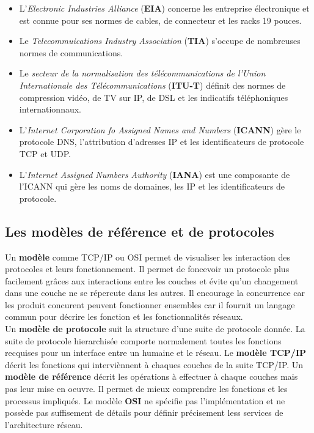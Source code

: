  \begin{itemize}
	 \item L'\textit{Electronic Industries Alliance} (\textbf{EIA}) concerne les entreprise électronique et est connue pour ses normes de cables, de connecteur et les racks 19 pouces.
	 \item Le \textit{Telecommuications Industry Association} (\textbf{TIA}) s'occupe de nombreuses normes de communications.
	 \item Le \textit{secteur de la normalisation des télécommunications de l'Union Internationale des Télécommunications} (\textbf{ITU-T}) définit des normes de compression vidéo, de TV sur IP, de DSL et les indicatifs téléphoniques internationnaux.
	 \item L'\textit{Internet Corporation fo Assigned Names and Numbers} (\textbf{ICANN}) gère le protocole DNS, l'attribution d'adresses IP et les identificateurs de protocole TCP et UDP\@.
	 \item L'\textit{Internet Assigned Numbers Authority} (\textbf{IANA}) est une composante de l'ICANN qui gère les noms de domaines, les IP et les identificateurs de protocole.
 \end{itemize}

 \subsection{Les modèles de référence et de protocoles}
 Un \textbf{modèle} comme TCP/IP ou OSI permet de visualiser les interaction des protocoles et leurs fonctionnement. Il permet de foncevoir un protocole plus facilement grâces aux interactions entre les couches et évite qu'un changement dans une couche ne se répercute dans les autres. Il encourage la concurrence car les produit concurent peuvent fonctionner ensembles car il fournit un langage commun pour décrire les fonction et les fonctionnalités réseaux.\\

 \indent
 Un \textbf{modèle de protocole} suit la structure d'une suite de protocole donnée. La suite de protocole hierarchisée comporte normalement toutes les fonctions recquises pour un interface entre un humaine et le réseau. Le \textbf{modèle TCP/IP} décrit les fonctions qui interviènnent à chaques couches de la suite TCP/IP\@.
 \indent
 Un \textbf{modèle de référence} décrit les opérations à effectuer à chaque couches mais pas leur mise en oeuvre. Il permet de mieux comprendre les fonctions et les processus impliqués. Le modèle \textbf{OSI} ne spécifie pas l'implémentation et ne possède pas suffisement de détails pour définir précisement less services de l'architecture réseau.

